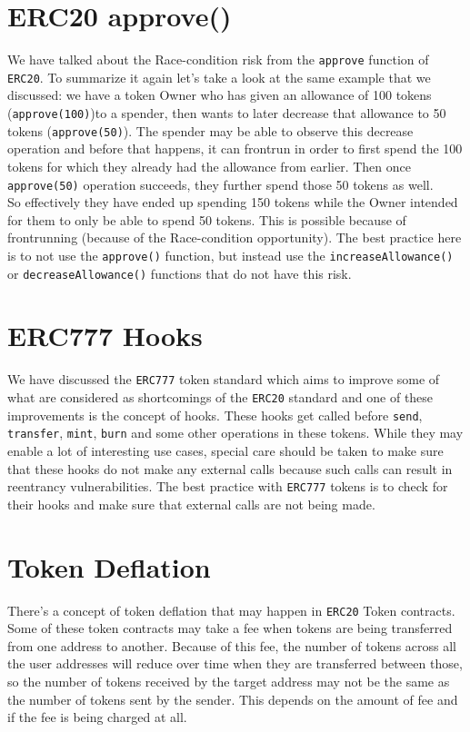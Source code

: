 \section{ERC20 approve()}
We have talked about the Race-condition risk from the \verb|approve| function of \verb|ERC20|. To summarize it again let's take a look at the same example that we discussed: we have a token Owner who has given an allowance of 100 tokens (\verb|approve(100)|)to a spender, then wants to later decrease that allowance to 50 tokens (\verb|approve(50)|). The spender may be able to observe this decrease operation and before that happens, it can frontrun in order to first spend the 100 tokens for which they already had the allowance from earlier. Then once \verb|approve(50)| operation succeeds, they further spend those 50 tokens as well.\\

So effectively they have ended up spending 150 tokens while the Owner intended for them to only be able to spend 50 tokens. This is possible because of frontrunning (because of the Race-condition opportunity). The best practice here is to not use the \verb|approve()| function, but instead use the \verb|increaseAllowance()| or \verb|decreaseAllowance()| functions that do not have this risk.

\section{ERC777 Hooks}
We have discussed the \verb|ERC777| token standard which aims to improve some of what are considered as shortcomings of the \verb|ERC20| standard and one of these improvements is the concept of hooks. These hooks get called before \verb|send|, \verb|transfer|, \verb|mint|, \verb|burn| and some other operations in these tokens. While they may enable a lot of interesting use cases, special care should be taken to make sure that these hooks do not make any external calls because such calls can result in reentrancy vulnerabilities. The best practice with \verb|ERC777| tokens is to check for their hooks and make sure that external calls are not being made.

\section{Token Deflation}
There's a concept of token deflation that may happen in \verb|ERC20| Token contracts. Some of these token contracts may take a fee when tokens are being transferred from one address to another. Because of this fee, the number of tokens across all the user addresses will reduce over time when they are transferred between those, so the number of tokens received by the target address may not be the same as the number of tokens sent by the sender. This depends on the amount of fee and if the fee is being charged at all.\\

